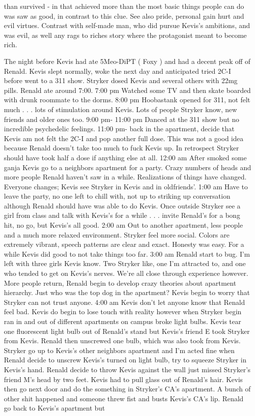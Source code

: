 \documentclass[12pt]{book}
\begin{document}
than survived - in that achieved more than the most basic things people can do was saw as good, in contrast to this clue. See also pride, personal gain hurt and evil virtues. Contrast with self-made man, who did pursue Kevis's ambitions, and was evil, as well any rags to riches story where the protagonist meant to become rich.



The night before Kevis had ate 5Meo-DiPT ( Foxy ) and had a decent peak off of Renald. Kevis slept normally, woke the next day and anticipated tried 2C-I before went to a 311 show. Stryker dosed Kevis and several others with 22mg pills. Renald ate around 7:00. 7:00 pm Watched some TV and then skate boarded with drunk roommate to the dorms. 8:00 pm Hoobastank opened for 311, not felt much . . .  lots of stimulation around Kevis. Lots of people Stryker know, new friends and older ones too. 9:00 pm- 11:00 pm Danced at the 311 show but no incredible psychedelic feelings. 11:00 pm- back in the apartment, decide that Kevis am not felt the 2C-I and pop another full dose. This was not a good idea because Renald doesn't take too much to fuck Kevis up. In retrospect Stryker should have took half a dose if anything else at all. 12:00 am After smoked some ganja Kevis go to a neighbors apartment for a party. Crazy numbers of heads and more people Renald haven't saw in a while. Realizations of things have changed. Everyone changes; Kevis see Stryker in Kevis and in oldfriends'. 1:00 am Have to leave the party, no one left to chill with, not up to striking up conversation although Renald should have was able to do Kevis. Once outside Stryker see a girl from class and talk with Kevis's for a while . . .  invite Renald's for a bong hit, no go, but Kevis's all good. 2:00 am Out to another apartment, less people and a much more relaxed environment. Stryker feel more social. Colors are extremely vibrant, speech patterns are clear and exact. Honesty was easy. For a while Kevis did good to not take things too far. 3:00 am Renald start to bug. I'm left with three girls Kevis know. Two Stryker like, one I'm attracted to, and one who tended to get on Kevis's nerves. We're all close through experience however. More people return, Renald begin to develop crazy theories about apartment hierarchy. Just who was the top dog in the apartment? Kevis begin to worry that Stryker can not trust anyone. 4:00 am Kevis don't let anyone know that Renald feel bad. Kevis do begin to lose touch with reality however when Stryker begin ran in and out of different apartments on campus broke light bulbs. Kevis tear one fluorescent light bulb out of Renald's stand but Kevis's friend E took Stryker from Kevis. Renald then unscrewed one bulb, which was also took from Kevis. Stryker go up to Kevis's other neighbors apartment and I'm acted fine when Renald decide to unscrew Kevis's turned on light bulb, try to squeeze Stryker in Kevis's hand. Renald decide to throw Kevis against the wall just missed Stryker's friend M's head by two feet. Kevis had to pull glass out of Renald's hair. Kevis then go next door and do the something in Stryker's CA's apartment. A bunch of other shit happened and someone threw fist and busts Kevis's CA's lip. Renald go back to Kevis's apartment but 
\end{document}
